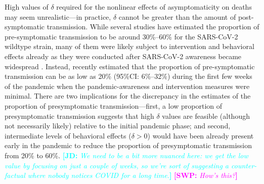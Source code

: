 \documentclass[12pt]{article}
\newcommand{\comment}{\showcomment}
\newcommand{\showcomment}[3]{\textcolor{#1}{\textbf{[#2: }\textsl{#3}\textbf{]}}}
\newcommand{\jd}[1]{\comment{cyan}{JD}{#1}}
\newcommand{\swp}[1]{\comment{magenta}{SWP}{#1}}
\begin{document}
High values of $\delta$ required for the nonlinear effects of asymptomaticity on deaths may seem unrealistic---in practice, $\delta$ cannot be greater than the amount of post-symptomatic transmission.
While several studies have estimated the proportion of pre-symptomatic transmission to be around 30\%--60\% for the SARS-CoV-2 wildtype strain, many of them were likely subject to intervention and behavioral effects already as they were conducted after SARS-CoV-2 awareness became widespread \citep{he2020temporal}.
Instead, \cite{sender2021unmitigated} recently estimated that the proportion of pre-symptomatic transmission can be as low as 20\% (95\%CI: 6\%--32\%) during the first few weeks of the pandemic when the pandemic-awareness and intervention measures were minimal.
There are two implications for the discrepancy in the estimates of the proportion of presymptomatic transmission---first, a low proportion of presymptomatic transmission suggests that high $\delta$ values are feasible (although not necessarily likely) relative to the initial pandemic phase; and second, intermediate levels of behavioral effects ($\delta > 0$) would have been already present early in the pandemic to reduce the proportion of presymptomatic transmission from 20\% to 60\%.
\jd{We need to be a bit more nuanced here: we get the low value by focusing on just a couple of weeks, so we're sort of suggesting a counter-factual where nobody notices COVID for a long time.}
\swp{How's this?}
\end{document}
